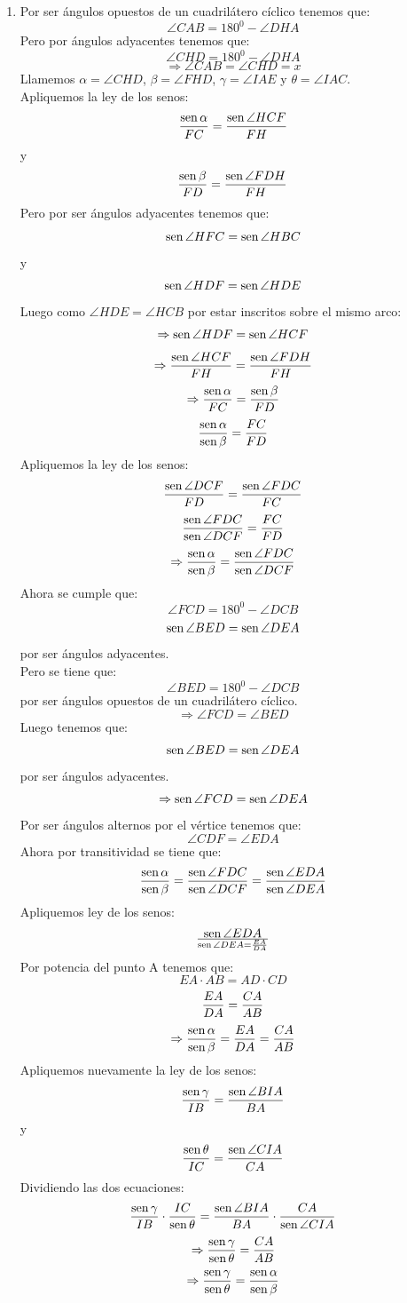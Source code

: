 \documentclass{book}
\newcommand{\sen}{\mathop{\rm sen}\nolimits} %
\begin{document}
\begin{enumerate}
\begin{enumerate}
\begin{center}
					\end{center}
					\item Por ser ángulos opuestos de un cuadrilátero cíclico tenemos que:
$$\angle CAB=180^0-\angle DHA$$
Pero por ángulos adyacentes tenemos que:
$$\angle CHD=180^0-\angle DHA$$
$$\Rightarrow\angle CAB=\angle CHD=x$$
Llamemos $\alpha=\angle CHD$, $\beta=\angle FHD$, $\gamma =\angle IAE$ y $\theta=\angle IAC$.\\
Apliquemos la ley de los senos:
$${\sen \alpha\over FC}={\sen {\angle HCF}\over FH}$$
y
$${\sen \beta\over FD}={\sen {\angle FDH}\over FH}$$
Pero por ser ángulos adyacentes tenemos que:
$$\sen {\angle HFC}=\sen {\angle HBC}$$
y
$$\sen {\angle HDF}=\sen {\angle HDE}$$
Luego como $\angle HDE=\angle HCB$ por estar inscritos sobre el mismo arco:
$$\Rightarrow\sen {\angle HDF}=\sen {\angle HCF}$$
$$\Rightarrow{\sen {\angle HCF}\over FH}={\sen {\angle FDH}\over FH}$$
$$\Rightarrow{\sen \alpha\over FC}={\sen \beta\over FD}$$
$${\sen \alpha\over\sen \beta}={FC\over FD}$$
Apliquemos la ley de los senos:
$${\sen {\angle DCF}\over FD}={\sen {\angle FDC}\over FC}$$
$${\sen {\angle FDC}\over\sen {\angle DCF}}={FC\over FD}$$
$$\Rightarrow{\sen \alpha\over\sen \beta}={\sen {\angle FDC}\over\sen {\angle DCF}}$$
Ahora se cumple que:
$$\angle FCD=180^0-\angle DCB$$
$$\sen {\angle BED}=\sen {\angle DEA}$$
por ser ángulos adyacentes.\\
Pero se tiene que:
$$\angle BED=180^0-\angle DCB$$
por ser ángulos opuestos de un cuadrilátero cíclico.
$$\Rightarrow\angle FCD=\angle BED$$
Luego tenemos que:
$$\sen {\angle BED}=\sen {\angle DEA}$$
por ser ángulos adyacentes.
$$\Rightarrow\sen {\angle FCD}=\sen {\angle DEA}$$
Por ser ángulos alternos por el vértice tenemos que:
$$\angle CDF=\angle EDA$$
Ahora por transitividad se tiene que:
$${\sen \alpha\over\sen \beta}={\sen {\angle FDC}\over\sen {\angle DCF}}={\sen {\angle EDA}\over\sen {\angle DEA}}$$
Apliquemos ley de los senos:
$$\sen {\angle EDA}\over\sen {\angle DEA}={EA\over DA}$$
Por potencia del punto A tenemos que:
$$EA\cdot AB=AD\cdot CD$$
$${EA\over DA}={CA\over AB}$$
$$\Rightarrow{\sen \alpha\over\sen \beta}={EA\over DA}={CA\over AB}$$
Apliquemos nuevamente la ley de los senos:
$${\sen \gamma\over IB}={\sen {\angle BIA}\over BA}$$
y
$${\sen \theta\over IC}={\sen {\angle CIA}\over CA}$$
Dividiendo las dos ecuaciones:
$${\sen \gamma\over IB}\cdot{IC\over\sen \theta}={\sen {\angle BIA}\over BA}\cdot{CA\over\sen {\angle CIA}}$$
$$\Rightarrow{\sen \gamma\over\sen \theta}={CA\over AB}$$
$$\Rightarrow{\sen \gamma\over\sen \theta}={\sen \alpha\over\sen \beta}$$

\end{enumerate}
\end{enumerate}
\end{document}
